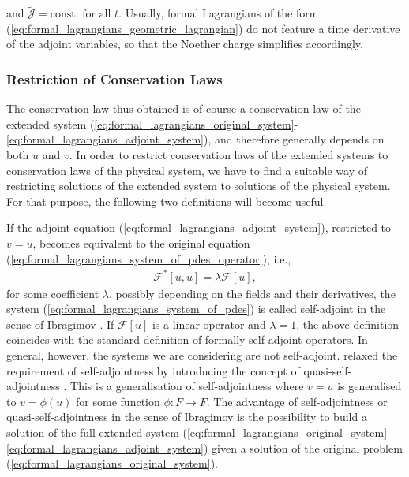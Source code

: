 \documentclass[12pt,a4paper,reqno]{article}
\begin{document}
and $\tilde{\mathcal{J}} = \text{const. for all ${\ensuremath{{\ensuremath{{t}}}}}$}$.
Usually, formal Lagrangians of the form (\ref{eq:formal_lagrangians_geometric_lagrangian}) do not feature a time derivative of the adjoint variables, so that the Noether charge simplifies accordingly.

\subsubsection*{Restriction of Conservation Laws}

The conservation law thus obtained is of course a conservation law of the extended system (\ref{eq:formal_lagrangians_original_system}-\ref{eq:formal_lagrangians_adjoint_system}), and therefore generally depends on both ${\ensuremath{{\ensuremath{{u}}}}}$ and ${\ensuremath{{\ensuremath{{v}}}}}$.
In order to restrict conservation laws of the extended systems to conservation laws of the physical system, we have to find a suitable way of restricting solutions of the extended system to solutions of the physical system.
For that purpose, the following two definitions will become useful.

If the adjoint equation (\ref{eq:formal_lagrangians_adjoint_system}), restricted to ${\ensuremath{{\ensuremath{{v}}}}} = {\ensuremath{{\ensuremath{{u}}}}}$, becomes equivalent to the original equation (\ref{eq:formal_lagrangians_system_of_pdes_operator}), i.e.,
\begin{align}\label{eq:adjoint_system_self_adjoint}
\mathcal{F}^{*} [{\ensuremath{{\ensuremath{{u}}}}}, {\ensuremath{{\ensuremath{{u}}}}}] = \lambda \mathcal{F} [{\ensuremath{{\ensuremath{{u}}}}}],
\end{align}
for some coefficient $\lambda$, possibly depending on the fields and their derivatives, the system (\ref{eq:formal_lagrangians_system_of_pdes}) is called self-adjoint in the sense of Ibragimov \cite{Ibragimov:2006}.
If $\mathcal{F} [{\ensuremath{{\ensuremath{{u}}}}}]$ is a linear operator and $\lambda=1$, the above definition coincides with the standard definition of formally self-adjoint operators.
In general, however, the systems we are considering are not self-adjoint.
\citeauthor{Ibragimov:2007b} relaxed the requirement of self-adjointness by introducing the concept of quasi-self-adjointness \cite{Ibragimov:2007b, Ibragimov:2010}.
This is a generalisation of self-adjointness where $v=u$ is generalised to $v = \phi(u)$ for some function $\phi : F \rightarrow F$.
The advantage of self-adjointness or quasi-self-adjointness in the sense of Ibragimov is the possibility to build a solution of the full extended system (\ref{eq:formal_lagrangians_original_system}-\ref{eq:formal_lagrangians_adjoint_system}) given a solution of the original problem (\ref{eq:formal_lagrangians_original_system}).
\end{document}
